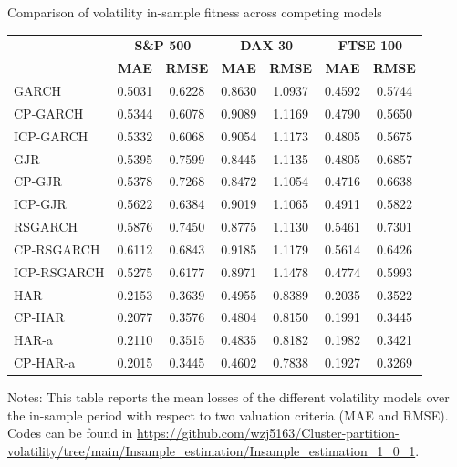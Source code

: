 \documentclass[preprint,12pt,authoryear]{elsarticle}
\begin{document}
\begin{center}
\begin{threeparttable}
\centering \footnotesize
\caption{\footnotesize Comparison of volatility in-sample fitness across competing models}\label{tab31_3}
\begin{tabular}{l c c c c c c}
\toprule
 & \multicolumn{2}{c}{\textbf{S\&P 500}} & \multicolumn{2}{c}{\textbf{DAX 30}} & \multicolumn{2}{c}{\textbf{FTSE 100}} \\
 \cmidrule(r){2-3} \cmidrule(r){4-5} \cmidrule(r){6-7}
 & \textbf{MAE} & \textbf{RMSE} & \textbf{MAE} & \textbf{RMSE} & \textbf{MAE} & \textbf{RMSE} \\
\cmidrule{2-7}
GARCH        & 0.5031   & 0.6228 & 0.8630 & 1.0937 & 0.4592 & 0.5744 \\
CP-GARCH     & 0.5344   & 0.6078 & 0.9089 & 1.1169 & 0.4790 & 0.5650 \\
ICP-GARCH    & 0.5332   & 0.6068 & 0.9054 & 1.1173 & 0.4805 & 0.5675 \\
GJR          & 0.5395   & 0.7599 & 0.8445 & 1.1135 & 0.4805 & 0.6857 \\
CP-GJR       & 0.5378   & 0.7268 & 0.8472 & 1.1054 & 0.4716 & 0.6638 \\
ICP-GJR      & 0.5622   & 0.6384 & 0.9019 & 1.1065 & 0.4911 & 0.5822 \\
RSGARCH      & 0.5876   & 0.7450 & 0.8775 & 1.1130 & 0.5461 & 0.7301 \\
CP-RSGARCH   & 0.6112   & 0.6843 & 0.9185 & 1.1179 & 0.5614 & 0.6426 \\
ICP-RSGARCH  & 0.5275   & 0.6177 & 0.8971 & 1.1478 & 0.4774 & 0.5993 \\
\midrule
HAR          & 0.2153   & 0.3639 & 0.4955 & 0.8389 & 0.2035 & 0.3522 \\
CP-HAR       & 0.2077   & 0.3576 & 0.4804 & 0.8150 & 0.1991 & 0.3445 \\
HAR-a        & 0.2110   & 0.3515 & 0.4835 & 0.8182 & 0.1982 & 0.3421 \\
CP-HAR-a     & 0.2015   & 0.3445 & 0.4602 & 0.7838 & 0.1927 & 0.3269 \\
\bottomrule
\end{tabular}
Notes: This table reports the mean losses of the different volatility models over the in-sample period with respect to two valuation criteria (MAE and RMSE).
Codes can be found in \url{https://github.com/wzj5163/Cluster-partition-volatility/tree/main/Insample_estimation/Insample_estimation_1_0_1}.
\end{threeparttable}
\end{center}
\end{document}
